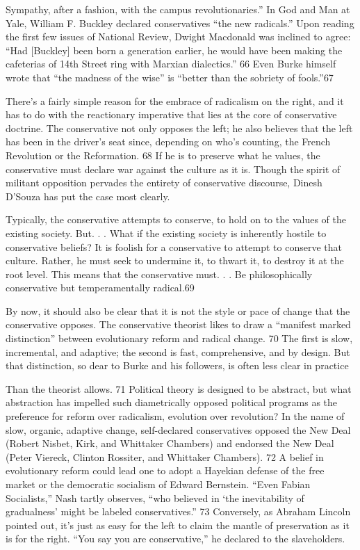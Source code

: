  \par 
Sympathy, after a fashion, with the campus revolutionaries.” In God and Man at Yale, William F. Buckley declared conservatives “the new radicals.” Upon reading the first few issues of National Review, Dwight Macdonald was inclined to agree: “Had [Buckley] been born a generation earlier, he would have been making the cafeterias of 14th Street ring with Marxian dialectics.” {\color{blue}66} Even Burke himself wrote that “the madness of the wise” is “better than the sobriety of fools.”{\color{blue}67}
 \par 
There’s a fairly simple reason for the embrace of radicalism on the right, and it has to do with the reactionary imperative that lies at the core of conservative doctrine. The conservative not only opposes the left; he also believes that the left has been in the driver’s seat since, depending on who’s counting, the French Revolution or the Reformation. {\color{blue}68} If he is to preserve what he values, the conservative must declare war against the culture as it is. Though the spirit of militant opposition pervades the entirety of conservative discourse, Dinesh D’Souza has put the case most clearly.
 \par 
Typically, the conservative attempts to conserve, to hold on to the values of the existing society. But. . . What if the existing society is inherently hostile to conservative beliefs? It is foolish for a conservative to attempt to conserve that culture. Rather, he must seek to undermine it, to thwart it, to destroy it at the root level. This means that the conservative must. . . Be philosophically conservative but temperamentally radical.{\color{blue}69}
 \par 
By now, it should also be clear that it is not the style or pace of change that the conservative opposes. The conservative theorist likes to draw a “manifest marked distinction” between evolutionary reform and radical change. {\color{blue}70} The first is slow, incremental, and adaptive; the second is fast, comprehensive, and by design. But that distinction, so dear to Burke and his followers, is often less clear in practice
 \par 
Than the theorist allows. {\color{blue}71} Political theory is designed to be abstract, but what abstraction has impelled such diametrically opposed political programs as the preference for reform over radicalism, evolution over revolution? In the name of slow, organic, adaptive change, self-declared conservatives opposed the New Deal (Robert Nisbet, Kirk, and Whittaker Chambers) and endorsed the New Deal (Peter Viereck, Clinton Rossiter, and Whittaker Chambers). {\color{blue}72} A belief in evolutionary reform could lead one to adopt a Hayekian defense of the free market or the democratic socialism of Edward Bernstein. “Even Fabian Socialists,” Nash tartly observes, “who believed in ‘the inevitability of gradualness’ might be labeled conservatives.” {\color{blue}73} Conversely, as Abraham Lincoln pointed out, it’s just as easy for the left to claim the mantle of preservation as it is for the right. “You say you are conservative,” he declared to the slaveholders.
